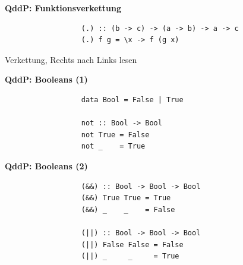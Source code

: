 \documentclass[unknownkeysallowed]{beamer}
\begin{document}
  
  \begin{frame}[fragile]

    \begin{center}
    \Large\textbf{QddP: Funktionsverkettung}\\\bigskip

\begin{verbatim}
                  (.) :: (b -> c) -> (a -> b) -> a -> c
                  (.) f g = \x -> f (g x)
\end{verbatim}

Verkettung, Rechts nach Links lesen

    \end{center}
\end{frame}

  
  \begin{frame}[fragile]

    \begin{center}
    \Large\textbf{QddP: Booleans (1)}\\\bigskip

\begin{verbatim}
                  data Bool = False | True
                  
                  not :: Bool -> Bool
                  not True = False
                  not _    = True
\end{verbatim}

    \end{center}
\end{frame}

  
  \begin{frame}[fragile]

    \begin{center}
    \Large\textbf{QddP: Booleans (2)}\\\bigskip

\begin{verbatim}
                  (&&) :: Bool -> Bool -> Bool
                  (&&) True True = True
                  (&&) _    _    = False
                  
                  (||) :: Bool -> Bool -> Bool
                  (||) False False = False
                  (||) _     _     = True
\end{verbatim}

    \end{center}
\end{frame}
\end{document}
